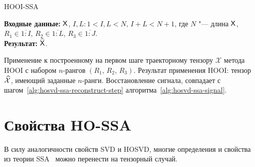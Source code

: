 \documentclass[specialist,
  substylefile=spbu.rtx,
subf,href,colorlinks=true, 12pt]{disser}
\theoremstyle{plain}
\theoremstyle{definition}
\theoremstyle{remark}
\newcommand{\Input}{\textbf{Входные данные: }}
\newcommand{\Output}{\textbf{Результат: }}
\begin{document}
\begin{algorithm}[!ht]
  \caption{HOOI-SSA}
  \label{alg:hooi-ssa}
  \Input $\mathsf{X}$, $I,L: 1< I,L <N,\, I + L < N + 1$, где $N$ "--- длина $\mathsf{X}$, $R_1 \in \overline{1:I}$,
  $R_2 \in \overline{1:L}$, $R_3 \in \overline{1:J}$.\\
  \Output $\widehat{\mathsf{X}}$.

  \begin{algorithmic}[1]
    \State Применение к построенному на первом шаге траекторному тензору $\mathcal{X}$ метода
    HOOI с набором $n$-рангов $(R_1,\, R_2,\, R_3)$. Результат применения HOOI: тензор $\widehat{\mathcal{X}}$,
    имеющий заданные $n$-ранги.
    \State Восстановление сигнала, совпадает с шагом~\ref{alg:hosvd-ssa-reconstruct-step}
    алгоритма~\ref{alg:hosvd-ssa-signal}.
  \end{algorithmic}
\end{algorithm}


\section{Свойства HO-SSA}\label{sec:HO-SSA-properties}
В силу аналогичности свойств SVD и HOSVD, многие определения и свойства из теории SSA~\cite{ssa} можно перенести на тензорный случай.
\end{document}
